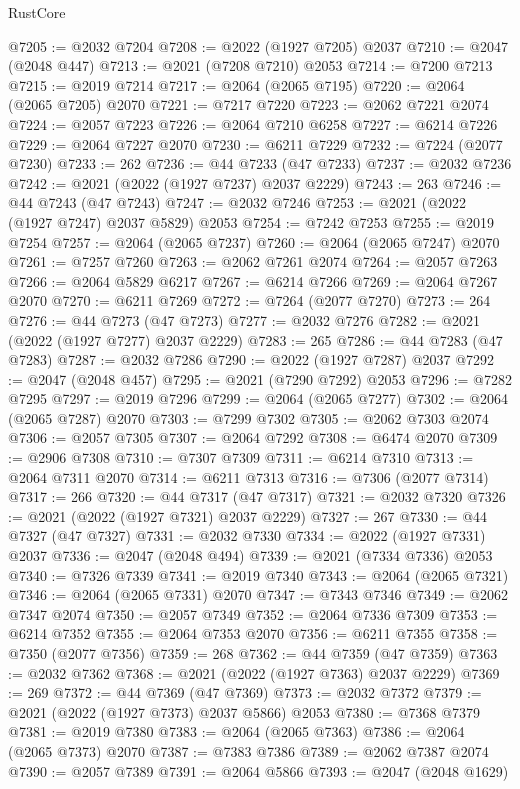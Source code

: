 \begin{lexlean}{RustCore}
\begin{coremodule}
@7205 := @2032 @7204
@7208 := @2022 (@1927 @7205) @2037
@7210 := @2047 (@2048 @447)
@7213 := @2021 (@7208 @7210) @2053
@7214 := @7200 @7213
@7215 := @2019 @7214
@7217 := @2064 (@2065 @7195)
@7220 := @2064 (@2065 @7205) @2070
@7221 := @7217 @7220
@7223 := @2062 @7221 @2074
@7224 := @2057 @7223
@7226 := @2064 @7210 @6258
@7227 := @6214 @7226
@7229 := @2064 @7227 @2070
@7230 := @6211 @7229
@7232 := @7224 (@2077 @7230)
@7233 := 262
@7236 := @44 @7233 (@47 @7233)
@7237 := @2032 @7236
@7242 := @2021 (@2022 (@1927 @7237) @2037 @2229)
@7243 := 263
@7246 := @44 @7243 (@47 @7243)
@7247 := @2032 @7246
@7253 := @2021 (@2022 (@1927 @7247) @2037 @5829) @2053
@7254 := @7242 @7253
@7255 := @2019 @7254
@7257 := @2064 (@2065 @7237)
@7260 := @2064 (@2065 @7247) @2070
@7261 := @7257 @7260
@7263 := @2062 @7261 @2074
@7264 := @2057 @7263
@7266 := @2064 @5829 @6217
@7267 := @6214 @7266
@7269 := @2064 @7267 @2070
@7270 := @6211 @7269
@7272 := @7264 (@2077 @7270)
@7273 := 264
@7276 := @44 @7273 (@47 @7273)
@7277 := @2032 @7276
@7282 := @2021 (@2022 (@1927 @7277) @2037 @2229)
@7283 := 265
@7286 := @44 @7283 (@47 @7283)
@7287 := @2032 @7286
@7290 := @2022 (@1927 @7287) @2037
@7292 := @2047 (@2048 @457)
@7295 := @2021 (@7290 @7292) @2053
@7296 := @7282 @7295
@7297 := @2019 @7296
@7299 := @2064 (@2065 @7277)
@7302 := @2064 (@2065 @7287) @2070
@7303 := @7299 @7302
@7305 := @2062 @7303 @2074
@7306 := @2057 @7305
@7307 := @2064 @7292
@7308 := @6474 @2070
@7309 := @2906 @7308
@7310 := @7307 @7309
@7311 := @6214 @7310
@7313 := @2064 @7311 @2070
@7314 := @6211 @7313
@7316 := @7306 (@2077 @7314)
@7317 := 266
@7320 := @44 @7317 (@47 @7317)
@7321 := @2032 @7320
@7326 := @2021 (@2022 (@1927 @7321) @2037 @2229)
@7327 := 267
@7330 := @44 @7327 (@47 @7327)
@7331 := @2032 @7330
@7334 := @2022 (@1927 @7331) @2037
@7336 := @2047 (@2048 @494)
@7339 := @2021 (@7334 @7336) @2053
@7340 := @7326 @7339
@7341 := @2019 @7340
@7343 := @2064 (@2065 @7321)
@7346 := @2064 (@2065 @7331) @2070
@7347 := @7343 @7346
@7349 := @2062 @7347 @2074
@7350 := @2057 @7349
@7352 := @2064 @7336 @7309
@7353 := @6214 @7352
@7355 := @2064 @7353 @2070
@7356 := @6211 @7355
@7358 := @7350 (@2077 @7356)
@7359 := 268
@7362 := @44 @7359 (@47 @7359)
@7363 := @2032 @7362
@7368 := @2021 (@2022 (@1927 @7363) @2037 @2229)
@7369 := 269
@7372 := @44 @7369 (@47 @7369)
@7373 := @2032 @7372
@7379 := @2021 (@2022 (@1927 @7373) @2037 @5866) @2053
@7380 := @7368 @7379
@7381 := @2019 @7380
@7383 := @2064 (@2065 @7363)
@7386 := @2064 (@2065 @7373) @2070
@7387 := @7383 @7386
@7389 := @2062 @7387 @2074
@7390 := @2057 @7389
@7391 := @2064 @5866
@7393 := @2047 (@2048 @1629)

\end{coremodule}
\end{lexlean}
